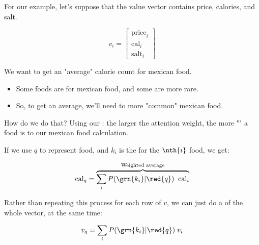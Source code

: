         For our example, let's suppose that the value vector contains price, calories, and salt.

        \begin{equation}
            v_i = \begin{bmatrix}
                \text{price}_i \\ \text{cal}_i \\ \text{salt}_i
            \end{bmatrix}
        \end{equation}

        We want to get an "average" calorie count for mexican food.

        \begin{itemize}
            \item Some foods are  for mexican food, and some are more rare.

            \item So, to get an average, we'll need to  more "common" mexican food.
        \end{itemize}

        How do we do that? Using our : the larger the attention weight, the more "" a food is to our mexican food calculation.

        If we use $q$ to represent  food, and $k_i$ is the  for the $\nth{i}$ food, we get:

        \begin{equation}
            \text{cal}_{q} = 
            \overbrace{
                \sum_i P(\grn{k_i}|\red{q}) \;\; \text{cal}_{i}
            }^{\text{Weighted average}}
        \end{equation}

        Rather than repeating this process for each row of $v$, we can just do a  of the whole vector, at the same time:

        \begin{equation}
            v_{q} = 
                \sum_i P(\grn{k_i}|\red{q}) \; v_{i}
        \end{equation}

